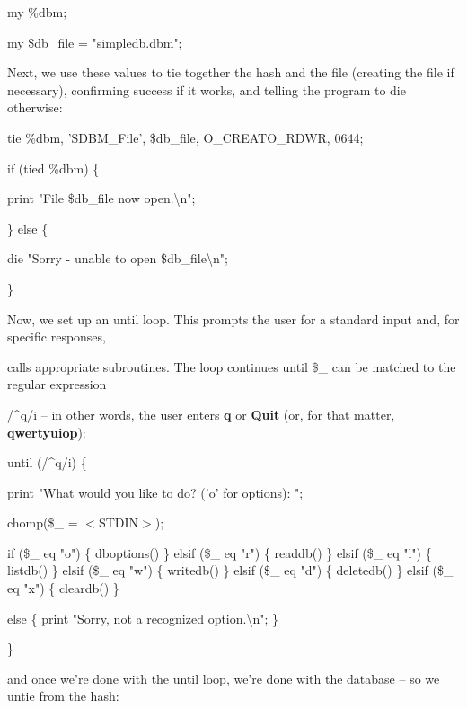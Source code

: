 \documentclass[a4paper,11pt]{book}
\begin{document}
\noindent my \%dbm;

\noindent my \$db\_file = "simpledb.dbm";

\noindent 

\noindent Next, we use these values to tie together the hash and the file (creating the file if necessary), confirming success if it works, and telling the program to die otherwise:

\noindent 

\noindent tie \%dbm, 'SDBM\_File', \$db\_file, O\_CREAT\textbar O\_RDWR, 0644;

\noindent 

\noindent if (tied \%dbm) \{

\noindent print "File \$db\_file now open.\textbackslash n";

\noindent \} else \{

\noindent die "Sorry - unable to open \$db\_file\textbackslash n";

\noindent \}

\noindent 

\noindent 

\noindent Now, we set up an until loop. This prompts the user for a standard input and, for specific responses,

\noindent calls appropriate subroutines. The loop continues until \$\_ can be matched to the regular expression

\noindent /\^{}q/i -- in other words, the user enters \textbf{q }or \textbf{Quit }(or, for that matter, \textbf{qwertyuiop}):

\noindent 

\noindent 

\noindent until (/\^{}q/i) \{

\noindent 

\noindent print "What would you like to do? ('o' for options): ";

\noindent chomp(\$\_  = $<$STDIN$>$);

\noindent 

\noindent if (\$\_  eq "o") \{ dboptions() \} elsif (\$\_  eq "r") \{ readdb() \} elsif (\$\_  eq "l") \{ listdb() \} elsif (\$\_  eq "w") \{ writedb() \} elsif (\$\_  eq "d") \{ deletedb() \} elsif (\$\_  eq "x") \{ cleardb() \}

\noindent else \{ print "Sorry, not a recognized option.\textbackslash n"; \}

\noindent \}

\noindent 

\noindent and once we're done with the until loop, we're done with the database -- so we untie from the hash:
\end{document}
